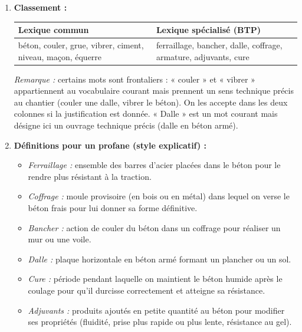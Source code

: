 \documentclass[11pt]{article}
\begin{document}
\begin{corrige}
\begin{enumerate}
    \item \textbf{Classement :}
    \begin{center}
    \begin{tabularx}{\linewidth}{|X|X|}\hline
    \textbf{Lexique commun} & \textbf{Lexique spécialisé (BTP)} \\ \hline
    béton, couler, grue, vibrer, ciment, niveau, maçon, équerre & ferraillage, bancher, dalle, coffrage, armature, adjuvants, cure \\ \hline
    \end{tabularx}
    \end{center}
    \emph{Remarque :} certains mots sont frontaliers : « couler » et « vibrer » appartiennent au vocabulaire courant mais prennent un sens technique précis au chantier (couler une dalle, vibrer le béton). On les accepte dans les deux colonnes si la justification est donnée. « Dalle » est un mot courant mais désigne ici un ouvrage technique précis (dalle en béton armé).
    \item \textbf{Définitions pour un profane (style explicatif) :}
    \begin{itemize}
        \item \emph{Ferraillage :} ensemble des barres d'acier placées dans le béton pour le rendre plus résistant à la traction.
        \item \emph{Coffrage :} moule provisoire (en bois ou en métal) dans lequel on verse le béton frais pour lui donner sa forme définitive.
        \item \emph{Bancher :} action de couler du béton dans un coffrage pour réaliser un mur ou une voile.
        \item \emph{Dalle :} plaque horizontale en béton armé formant un plancher ou un sol.
        \item \emph{Cure :} période pendant laquelle on maintient le béton humide après le coulage pour qu'il durcisse correctement et atteigne sa résistance.
        \item \emph{Adjuvants :} produits ajoutés en petite quantité au béton pour modifier ses propriétés (fluidité, prise plus rapide ou plus lente, résistance au gel).
    \end{itemize}
\end{enumerate}
\end{corrige}
\end{document}
